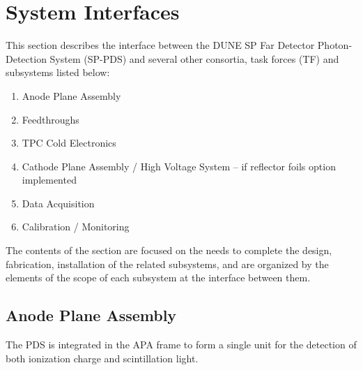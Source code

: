 \section{System Interfaces}
\label{sec:fdsp-pd-intfc}



This section describes the interface between the DUNE SP Far Detector Photon-Detection System (SP-PDS) and several other consortia, task forces (TF) and subsystems listed below:

\begin{enumerate}
\item Anode Plane Assembly
\item{Feedthroughs}
\item TPC Cold Electronics 
\item{Cathode Plane Assembly / High Voltage System -- if reflector foils option implemented}
\item Data Acquisition
\item Calibration / Monitoring
\end{enumerate}

The contents of the section are focused on the needs to complete the design, fabrication, installation of the related subsystems, and are organized by the elements of the scope of each subsystem at the interface between them.


\subsection{Anode Plane Assembly}
\label{sec:fdsp-pd-intfc-apa}



The PDS is integrated in the APA frame to form a single unit for the detection of both ionization charge and scintillation light.

